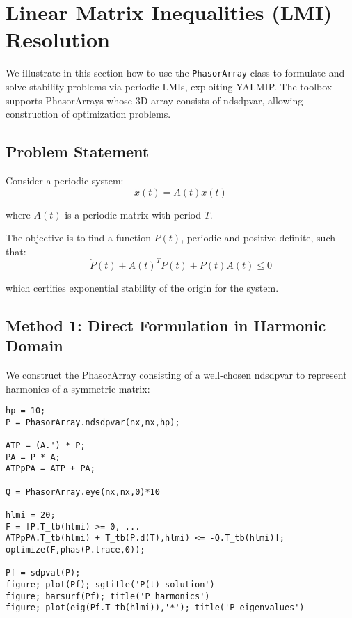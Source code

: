 \documentclass[11pt,a4paper]{article}
\begin{document}
\section{Linear Matrix Inequalities (LMI) Resolution}

We illustrate in this section how to use the \texttt{PhasorArray} class to formulate and solve stability problems via periodic LMIs, exploiting YALMIP. The toolbox supports PhasorArrays whose 3D array consists of ndsdpvar, allowing construction of optimization problems.

\subsection{Problem Statement}

Consider a periodic system:
\begin{equation}
\dot{x}(t) = A(t) x(t)
\end{equation}

where $A(t)$ is a periodic matrix with period $T$.

The objective is to find a function $P(t)$, periodic and positive definite, such that:
\begin{equation}
\dot{P}(t) + A(t)^T P(t) + P(t) A(t) \leq 0
\end{equation}

which certifies exponential stability of the origin for the system.

\subsection{Method 1: Direct Formulation in Harmonic Domain}

We construct the PhasorArray consisting of a well-chosen ndsdpvar to represent harmonics of a symmetric matrix:

\begin{lstlisting}[style=matlabstyle]
hp = 10;
P = PhasorArray.ndsdpvar(nx,nx,hp);

ATP = (A.') * P;
PA = P * A;
ATPpPA = ATP + PA;

Q = PhasorArray.eye(nx,nx,0)*10

hlmi = 20;
F = [P.T_tb(hlmi) >= 0, ...
ATPpPA.T_tb(hlmi) + T_tb(P.d(T),hlmi) <= -Q.T_tb(hlmi)];
optimize(F,phas(P.trace,0));

Pf = sdpval(P);
figure; plot(Pf); sgtitle('P(t) solution')
figure; barsurf(Pf); title('P harmonics')
figure; plot(eig(Pf.T_tb(hlmi)),'*'); title('P eigenvalues')
\end{lstlisting}
\end{document}
